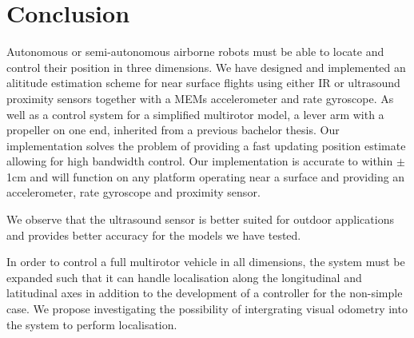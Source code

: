 \section{Conclusion}
Autonomous or semi-autonomous airborne robots must be able to locate and control their position in three dimensions. We have designed
and implemented an alititude estimation scheme for near surface flights using either IR or ultrasound proximity sensors together with 
a MEMs accelerometer and rate gyroscope. As well as a control system for a simplified multirotor model, a lever arm with a propeller 
on one end, inherited from a previous bachelor thesis. Our implementation solves the problem of providing a fast updating position
estimate allowing for high bandwidth control. Our implementation is accurate to within \(\pm\)1cm and will function on any platform
operating near a surface and providing an accelerometer, rate gyroscope and proximity sensor.

We observe that the ultrasound 
sensor is better suited for outdoor applications and provides better accuracy for the models we have tested.

In order to control a full multirotor vehicle in all dimensions, the system must be expanded such that it can handle localisation 
along the longitudinal and latitudinal axes in addition to the development of a controller for the non-simple case. 
We propose investigating the possibility of intergrating visual odometry into the system to perform localisation.
